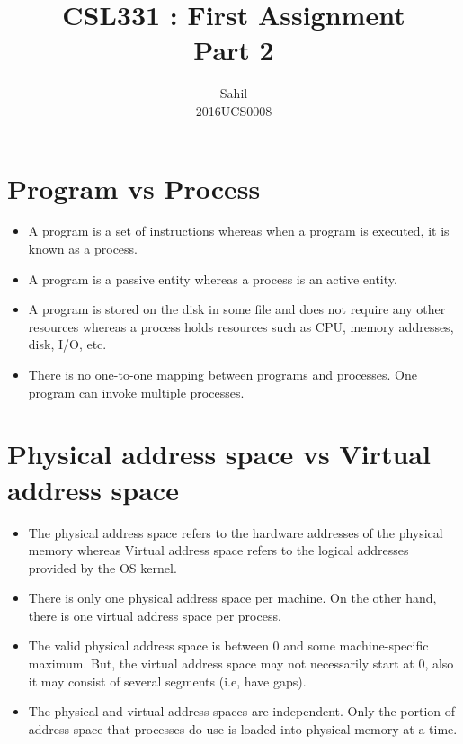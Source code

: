 \documentclass[]{report}
\title{\centering CSL331 : First Assignment \\Part 2}
\author{\LARGE Sahil\\2016UCS0008}
\begin{document}
\maketitle


\section{Program vs Process}
\large
\begin{itemize}
	\item A program is a set of instructions whereas when a program is executed, it is known as a process.
	\item A program is a passive entity whereas a process is an active entity.
	\item A program is stored on the disk in some file and does not require any other resources whereas a process holds resources such as CPU, memory addresses, disk, I/O, etc.
	\item There is no one-to-one mapping between programs and processes. One program can invoke multiple processes.
\end{itemize}

\section{Physical address space vs Virtual address space}
\begin{itemize}
	\item The physical address space refers to the hardware addresses of the physical memory whereas Virtual address space refers to the logical addresses provided by the OS kernel.
	\item There is only one physical address space per machine. On the other hand, there is one virtual address space per process.
	\item The valid physical address space is between 0 and some machine-specific maximum. But, the virtual address space may not necessarily start at 0, also it may consist of several segments (i.e, have gaps).
	\item The physical and virtual address spaces are independent. Only the portion of address space that processes do use is loaded into physical memory at a time. 
\end{itemize}
\end{document}
